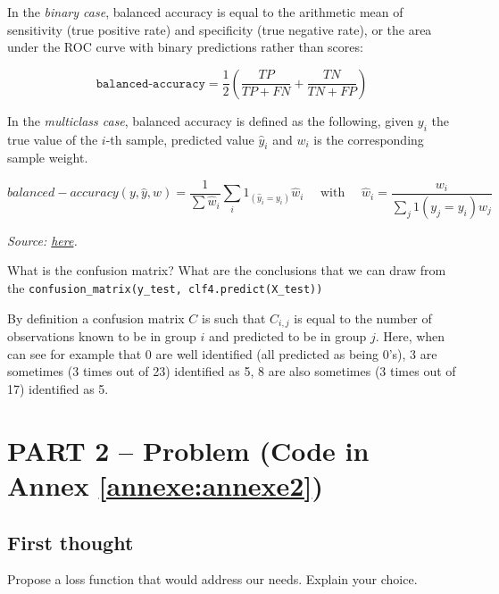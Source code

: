 \documentclass[10pt,a4paper]{article}
\theoremstyle{break}
\begin{document}
In the \emph{binary case}, balanced accuracy is equal to the arithmetic mean of sensitivity (true positive rate) and specificity (true negative rate), or the area under the ROC curve with binary predictions rather than scores:

\[
\texttt{balanced-accuracy} = \frac{1}{2}\left( \frac{TP}{TP + FN} + \frac{TN}{TN + FP}\right )
\]

In the \emph{multiclass case}, balanced accuracy is defined as the following, given \(y_i\) the true value of the \(i\)-th sample, predicted value \(\hat{y}_i\) and \(w_i\) is the corresponding sample weight.

\[
balanced-accuracy(y,\hat y,w)=\frac{1}{\sum \hat w_i} \sum_i 1_{(\hat y_i = y_i)}\hat w_i
\quad \text{ with } \quad \hat{w}_i = \frac{w_i}{\sum_j{1(y_j = y_i) w_j}}
\]

\emph{Source: \href{https://scikit-learn.org/stable/modules/model_evaluation.html\#balanced-accuracy-score}{here}.}

\begin{tcolorbox}

What is the confusion matrix? What are the conclusions that we can draw from the \texttt{confusion\_matrix(y\_test,\ clf4.predict(X\_test))}

\end{tcolorbox}

By definition a confusion matrix \(C\) is such that \(C_{i,j}\) is equal to the number of observations known to be in group \(i\) and predicted to be in group \(j\).
Here, when can see for example that 0 are well identified (all predicted as being 0's), 3 are sometimes (3 times out of 23) identified as 5, 8 are also sometimes (3 times out of 17) identified as 5.

\hypertarget{part-2-problem-code-in-annex}{%
\section{\texorpdfstring{PART 2 -- Problem (Code in Annex \ref{annexe:annexe2})}{PART 2 -- Problem (Code in Annex )}}\label{part-2-problem-code-in-annex}}

\hypertarget{first-thought}{%
\subsection{First thought}\label{first-thought}}

\begin{tcolorbox}

Propose a loss function that would address our needs. Explain your choice.

\end{tcolorbox}
\end{document}
